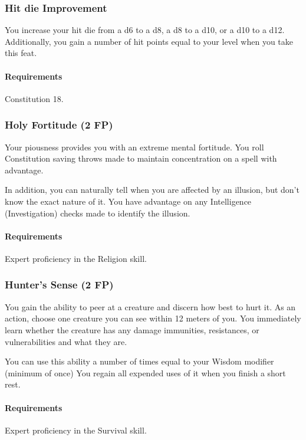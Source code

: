 \subsubsection{Hit die Improvement} \label{feat::hitdieimprovement}
    You increase your hit die from a d6 to a d8, a d8 to a d10, or a d10 to a d12.
    Additionally, you gain a number of hit points equal to your level when you take this feat.
    \paragraph{Requirements} Constitution 18.
\subsubsection{Holy Fortitude (2 FP)} \label{feat::holyfortitude}
    Your piousness provides you with an extreme mental fortitude.
    You roll Constitution saving throws made to maintain concentration on a spell with advantage.

    In addition, you can naturally tell when you are affected by an illusion, but don't know the exact nature of it.
    You have advantage on any Intelligence (Investigation) checks made to identify the illusion.
    \paragraph{Requirements} Expert proficiency in the Religion skill.
\subsubsection{Hunter's Sense (2 FP)} \label{feat::hunterssense}
    You gain the ability to peer at a creature and discern how best to hurt it.
    As an action, choose one creature you can see within 12 meters of you.
    You immediately learn whether the creature has any damage immunities, resistances, or vulnerabilities and what they are.

    You can use this ability a number of times equal to your Wisdom modifier (minimum of once)
     You regain all expended uses of it when you finish a short rest.
    \paragraph{Requirements} Expert proficiency in the Survival skill.
